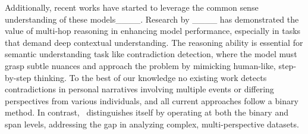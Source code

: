 Additionally, recent works have started to leverage the common sense understanding of these models____. Research by ____ has demonstrated the value of multi-hop reasoning in enhancing model performance, especially in tasks that demand deep contextual understanding. The reasoning ability is essential for semantic understanding task like contradiction detection, where the model must grasp subtle nuances and approach the problem by mimicking human-like, step-by-step thinking. To the best of our knowledge no existing work detects contradictions in personal narratives involving multiple events or differing perspectives from various individuals, and all current approaches follow a binary method. In contrast, \model\ distinguishes itself by operating at both the binary and span levels, addressing the gap in analyzing complex, multi-perspective datasets.